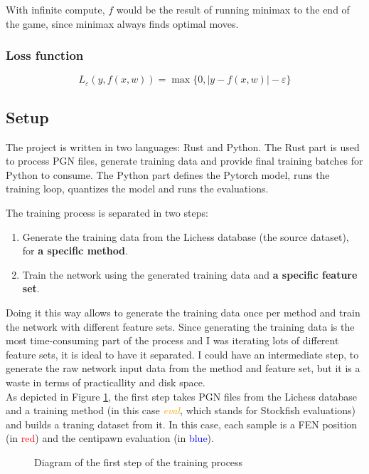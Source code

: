 With infinite compute, $f$ would be the result of running minimax to the end of the game, since minimax always finds optimal moves.


\subsubsection{Loss function}


\[
L_\varepsilon(y,f(x,w))=
\max\{0, |y-f(x,w)|-\varepsilon\}
\]


\subsection{Setup}

The project is written in two languages: Rust and Python. The Rust part is used to process PGN files, generate training data and provide final training batches for Python to consume. The Python part defines the Pytorch model, runs the training loop, quantizes the model and runs the evaluations.

The training process is separated in two steps:

\begin{enumerate}
\item Generate the training data from the Lichess database (the source dataset), for \textbf{a specific method}.
\item Train the network using the generated training data and \textbf{a specific feature set}.
\end{enumerate}

Doing it this way allows to generate the training data once per method and train the network with different feature sets. Since generating the training data is the most time-consuming part of the process and I was iterating lots of different feature sets, it is ideal to have it separated. I could have an intermediate step, to generate the raw network input data from the method and feature set, but it is a waste in terms of practicallity and disk space. \\

As depicted in Figure \ref{fig:database_to_train_data}, the first step takes PGN files from the Lichess database and a training method (in this case \textcolor{orange}{\textit{eval}}, which stands for Stockfish evaluations) and builds a traning dataset from it. In this case, each sample is a FEN position (in \textcolor{red}{red}) and the centipawn evaluation (in \textcolor{blue}{blue}).

\begin{figure}[h]
\centering
{}
\caption{Diagram of the first step of the training process}
\label{fig:database_to_train_data}
\end{figure}

